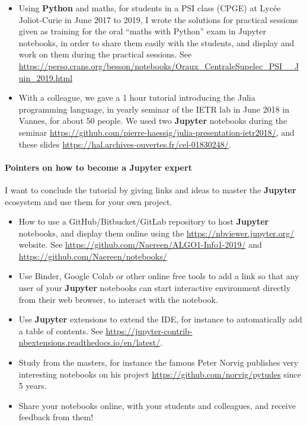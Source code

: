 \documentclass[runningheads]{llncs}
\newcommand{\Jupyter}{\textbf{Jupyter}}
\begin{document}
\begin{itemize}
    \item
    Using \textbf{Python} and maths,
    for students in a PSI class (CPGE) at Lyc{\'e}e Joliot-Curie in June 2017 to 2019,
    I wrote the solutions for practical sessions given as training for the oral ``maths with Python'' exam in Jupyter notebooks, in order to share them easily with the students, and display and work on them during the practical sessions.
    See \url{https://perso.crans.org/besson/notebooks/Oraux_CentraleSupelec_PSI__Juin_2019.html}

    \item
    With a colleague, we gave a 1 hour tutorial introducing the Julia programming language, in yearly seminar of the IETR lab in June 2018 in Vannes, for about 50 people.
    We used two \Jupyter{} notebooks during the seminar \url{https://github.com/pierre-haessig/julia-presentation-ietr2018/},
    and these slides \url{https://hal.archives-ouvertes.fr/cel-01830248/}.

\end{itemize}



\paragraph{Pointers on how to become a \Jupyter{} expert}

I want to conclude the tutorial by giving links and ideas to master the \Jupyter{} ecosystem and use them for your own project.

\begin{itemize}
    \item How to use a GitHub/Bitbucket/GitLab repository to host \Jupyter{} notebooks, and display them online using the \url{https://nbviewer.jupyter.org/} website.
    See \url{https://github.com/Naereen/ALGO1-Info1-2019/} and \url{https://github.com/Naereen/notebooks/}
    \item Use Binder, Google Colab or other online free tools to add a link so that any user of your \Jupyter{} notebooks can start interactive environment directly from their web browser, to interact with the notebook.
    \item Use \Jupyter{} extensions to extend the IDE, for instance to automatically add a table of contents. See \url{https://jupyter-contrib-nbextensions.readthedocs.io/en/latest/}.
    \item Study from the masters, for instance the famous Peter Norvig publishes very interesting notebooks on his project \url{https://github.com/norvig/pytudes} since 5 years.
    \item Share your notebooks online, with your students and colleagues, and receive feedback from them!
\end{itemize}
\end{document}
